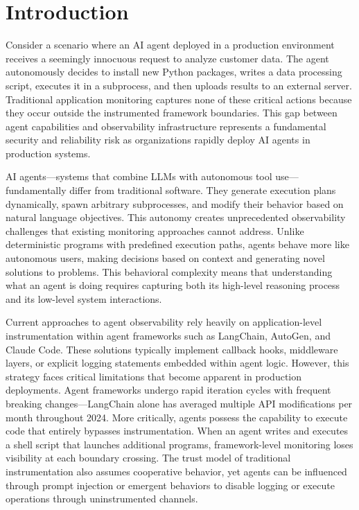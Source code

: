 \section{Introduction}

Consider a scenario where an AI agent deployed in a production environment receives a seemingly innocuous request to analyze customer data. The agent autonomously decides to install new Python packages, writes a data processing script, executes it in a subprocess, and then uploads results to an external server. Traditional application monitoring captures none of these critical actions because they occur outside the instrumented framework boundaries. This gap between agent capabilities and observability infrastructure represents a fundamental security and reliability risk as organizations rapidly deploy AI agents in production systems.

AI agents—systems that combine LLMs with autonomous tool use—fundamentally differ from traditional software. They generate execution plans dynamically, spawn arbitrary subprocesses, and modify their behavior based on natural language objectives. This autonomy creates unprecedented observability challenges that existing monitoring approaches cannot address. Unlike deterministic programs with predefined execution paths, agents behave more like autonomous users, making decisions based on context and generating novel solutions to problems. This behavioral complexity means that understanding what an agent is doing requires capturing both its high-level reasoning process and its low-level system interactions.

Current approaches to agent observability rely heavily on application-level instrumentation within agent frameworks such as LangChain, AutoGen, and Claude Code. These solutions typically implement callback hooks, middleware layers, or explicit logging statements embedded within agent logic. However, this strategy faces critical limitations that become apparent in production deployments. Agent frameworks undergo rapid iteration cycles with frequent breaking changes—LangChain alone has averaged multiple API modifications per month throughout 2024. More critically, agents possess the capability to execute code that entirely bypasses instrumentation. When an agent writes and executes a shell script that launches additional programs, framework-level monitoring loses visibility at each boundary crossing. The trust model of traditional instrumentation also assumes cooperative behavior, yet agents can be influenced through prompt injection or emergent behaviors to disable logging or execute operations through uninstrumented channels.


